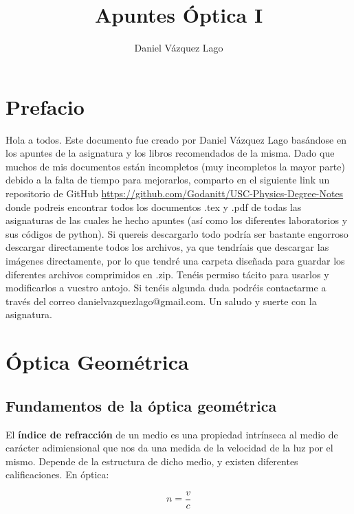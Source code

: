 \documentclass[12pt]{article}
\author{Daniel Vázquez Lago}
\title{Apuntes Óptica I}
\numberwithin{equation}{section}
\numberwithin{figure}{section}
\begin{document}
\maketitle

\newpage

\tableofcontents

\newpage
\section*{Prefacio}

Hola a todos. Este documento fue creado por Daniel Vázquez Lago basándose en los apuntes de la asignatura y los libros recomendados de la misma. Dado que muchos de mis documentos están incompletos (muy incompletos la mayor parte) debido a la falta de tiempo para mejorarlos, comparto en el siguiente link un repositorio de GitHub \url{https://github.com/Godanitt/USC-Physics-Degree-Notes} donde podreis encontrar todos los documentos .tex y .pdf de todas las asignaturas de las cuales he hecho apuntes (así como los diferentes laboratorios y sus códigos de python). Si quereis descargarlo todo podría ser bastante engorroso descargar directamente todos los archivos, ya que tendríais que descargar las imágenes directamente, por lo que tendré una carpeta diseñada para guardar los diferentes archivos comprimidos en .zip. Tenéis permiso tácito para usarlos y modificarlos a vuestro antojo. Si tenéis algunda duda podréis contactarme a través del correo danielvazquezlago@gmail.com. Un saludo y suerte con la asignatura.

\newpage

\section{Óptica Geométrica}

\subsection{Fundamentos de la óptica geométrica}

El \textbf{índice de refracción} de un medio es una propiedad intrínseca al medio de carácter adimiensional que nos da una medida de la velocidad de la luz por el mismo. Depende de la estructura de dicho medio, y existen diferentes calificaciones. En óptica:

\begin{equation}
n = \frac{v}{c}
\end{equation}
\end{document}
